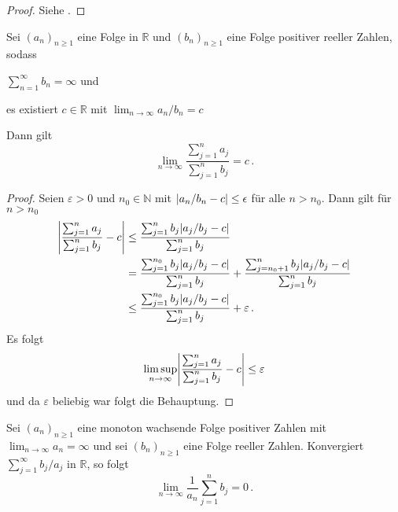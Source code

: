 \documentclass[ngerman,a4paper,11pt]{scrartcl}
\newcommand{\NN}{\mathbb{N}}
\newcommand{\RR}{\mathbb{R}}
\DeclarePairedDelimiter{\abs}{\lvert}{\rvert}		%
\begin{document}
\begin{proof}
 Siehe \cite[Satz~5.31 und Bemerkung~5.32(a)]{lpw}.
\end{proof}
\begin{lem}\label{lem:lhospital}
 Sei $(a_n)_{n\geq 1}$ eine Folge in $\RR$ und $(b_n)_{n\geq 1}$ eine Folge positiver reeller Zahlen, sodass 
 \begin{thmasslist}
 \item 
     $\sum_{n=1}^\infty b_n=\infty$ und
 \item es existiert $c\in\RR$ mit $\lim_{n\to\infty}a_n/b_n=c$
 \end{thmasslist}
 Dann gilt
 \begin{equation*}
  \lim_{n\to\infty} \frac{\sum_{j=1}^na_j}{\sum_{j=1}^nb_j}=c\,.
 \end{equation*}
\end{lem}
\begin{proof}
 Seien $\varepsilon >0$ und $n_0\in\NN$ mit $\abs{a_n/b_n-c}\leq\epsilon$
 für alle $n>n_0$. Dann gilt für $n>n_0$
 \begin{align*}
  \abs*{\frac{\sum_{j=1}^na_j}{\sum_{j=1}^nb_j}-c}&\leq\frac{\sum_{j=1}^nb_j\abs{a_j/b_j-c}}{\sum_{j=1}^nb_j} \\
&=\frac{\sum_{j=1}^{n_0}b_j\abs{a_j/b_j-c}}{\sum_{j=1}^nb_j}+\frac{\sum_{j=n_0+1}^nb_j\abs{a_j/b_j-c}}{\sum_{j=1}^nb_j} \\
&\leq\frac{\sum_{j=1}^{n_0}b_j\abs{a_j/b_j-c}}{\sum_{j=1}^nb_j}+\varepsilon\,.
 \end{align*}
Es folgt
\begin{equation*}
  \limsup_{n\to\infty} \abs*{\frac{\sum_{j=1}^na_j}{\sum_{j=1}^nb_j}-c}\leq\varepsilon
\end{equation*}
und da $\varepsilon$ beliebig war folgt die Behauptung.
\end{proof}
\begin{lem}\label{lem:kronecker}
 Sei $(a_n)_{n\geq 1}$ eine monoton wachsende Folge positiver Zahlen mit
 $\lim_{n\to\infty}a_n=\infty$ und sei $(b_n)_{n\geq 1}$ eine Folge reeller
 Zahlen. Konvergiert $\sum_{j=1}^\infty b_j/a_j$ in $\RR$, so folgt
 \begin{equation*}
  \lim_{n\to\infty} \frac{1}{a_n}\sum_{j=1}^nb_j=0\,.
 \end{equation*}
\end{lem}
\end{document}
